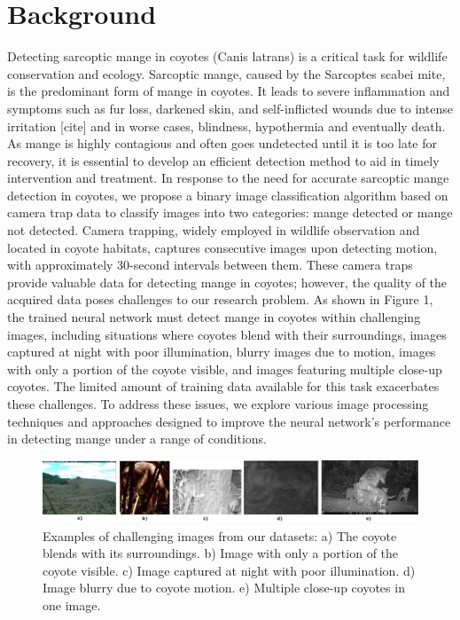 \documentclass{article}
\begin{document}
\section{Background}
Detecting sarcoptic mange in coyotes (Canis latrans) is a critical task for wildlife conservation and ecology. Sarcoptic mange, caused by the Sarcoptes scabei mite, is the predominant form of mange in coyotes. It leads to severe inflammation and symptoms such as fur loss, darkened skin, and self-inflicted wounds due to intense irritation [cite] and in worse cases, blindness, hypothermia and eventually death. As mange is highly contagious and often goes undetected until it is too late for recovery, it is essential to develop an efficient detection method to aid in timely intervention and treatment.
In response to the need for accurate sarcoptic mange detection in coyotes, we propose a binary image classification algorithm based on camera trap data to classify images into two categories: mange detected or mange not detected. Camera trapping, widely employed in wildlife observation and located in coyote habitats, captures consecutive images upon detecting motion, with approximately 30-second intervals between them. These camera traps provide valuable data for detecting mange in coyotes; however, the quality of the acquired data poses challenges to our research problem.
As shown in Figure 1, the trained neural network must detect mange in coyotes within challenging images, including situations where coyotes blend with their surroundings, images captured at night with poor illumination, blurry images due to motion, images with only a portion of the coyote visible, and images featuring multiple close-up coyotes. The limited amount of training data available for this task exacerbates these challenges. To address these issues, we explore various image processing techniques and approaches designed to improve the neural network's performance in detecting mange under a range of conditions.

\begin{figure}
\centering
\includegraphics[width=1.0\textwidth]{fig1.jpeg}
\caption{\label{fig:fig1}Examples of challenging images from our datasets: a) The coyote blends with its surroundings. b) Image with only a portion of the coyote visible. c) Image captured at night with poor illumination. d) Image blurry due to coyote motion. e) Multiple close-up coyotes in one image.}
\end{figure}
\end{document}
